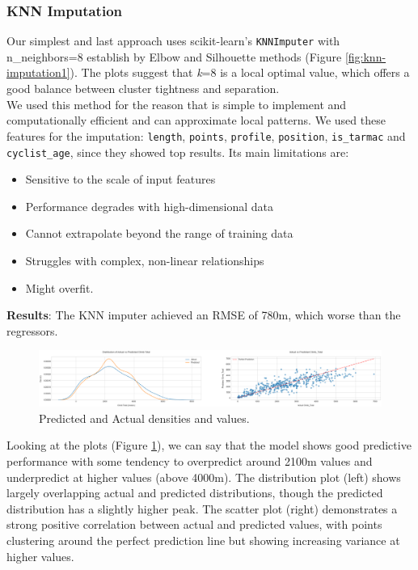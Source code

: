 \documentclass[a4paper, twoside]{article}
\begin{document}
\subsubsection{KNN Imputation}
Our simplest and last approach uses scikit-learn's \texttt{KNNImputer} with n\_neighbors=8 establish by Elbow and Silhouette methods (Figure \ref{fig:knn-imputation1}).
The plots suggest that \textit{k}=8 is a local optimal value, which offers a good balance between cluster tightness and separation.
\\
We used this method for the reason that is simple to implement and computationally efficient and can approximate local patterns. We used these features for the imputation: \texttt{length}, \texttt{points}, \texttt{profile}, \texttt{position}, \texttt{is\_tarmac} and \texttt{cyclist\_age}, since they showed top results.
Its main limitations are:
\begin{itemize}[noitemsep]
    \item Sensitive to the scale of input features
    \item Performance degrades with high-dimensional data
    \item Cannot extrapolate beyond the range of training data
    \item Struggles with complex, non-linear relationships
    \item Might overfit.
\end{itemize}
\textbf{Results}:
The KNN imputer achieved an RMSE of 780m, which worse than the regressors.
\begin{figure}[ht]
    \centering
    \includegraphics[width=1.0\textwidth]{assets/knn_imputation2.png}
    \caption{Predicted and Actual densities and values.}
    \label{fig:knn-imputation2}
\end{figure}
Looking at the plots (Figure \ref{fig:knn-imputation2}), we can say that the model shows good predictive performance with some tendency to overpredict around 2100m values and underpredict at higher values (above 4000m). The distribution plot (left) shows largely overlapping actual and predicted distributions, though the predicted distribution has a slightly higher peak. The scatter plot (right) demonstrates a strong positive correlation between actual and predicted values, with points clustering around the perfect prediction line but showing increasing variance at higher values.
\end{document}
